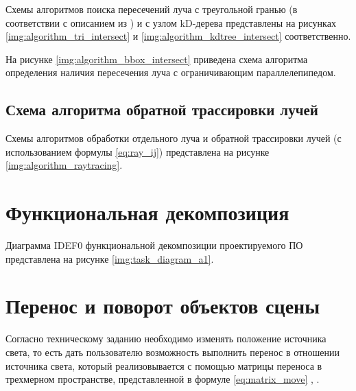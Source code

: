 Схемы алгоритмов поиска пересечений луча с треугольной гранью (в соответствии с описанием из \cite{moller2005fast}) и с узлом kD-дерева представлены на рисунках \ref{img:algorithm_tri_intersect} и \ref{img:algorithm_kdtree_intersect} соответственно.

На рисунке \ref{img:algorithm_bbox_intersect} приведена схема алгоритма определения наличия пересечения луча с ограничивающим параллелепипедом.

\subsection{Схема алгоритма обратной трассировки лучей}

Схемы алгоритмов обработки отдельного луча и обратной трассировки лучей (с использованием формулы \ref{eq:ray_ij}) представлена на рисунке \ref{img:algorithm_raytracing}.





\section{Функциональная декомпозиция}

Диаграмма IDEF0 функциональной декомпозиции проектируемого ПО представлена на рисунке \ref{img:task_diagram_a1}.


\section{Перенос и поворот объектов сцены}

Согласно техническому заданию необходимо изменять положение источника света, то есть дать пользователю возможность выполнить перенос в отношении источника света, который реализовывается с помощью матрицы переноса в трехмерном пространстве, представленной в формуле \ref{eq:matrix_move} \cite{куров}, \cite{боресков}.

